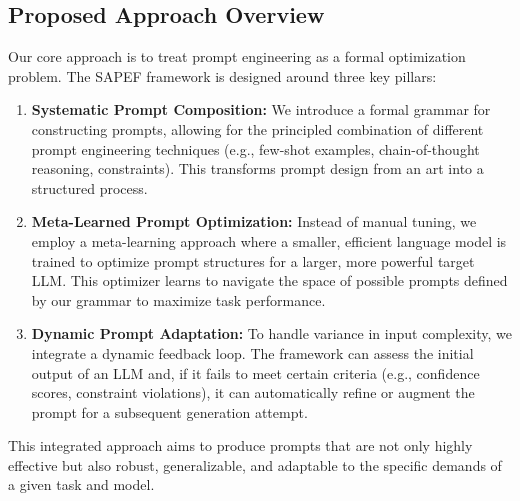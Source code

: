 \documentclass{article}
\begin{document}
\subsection{Proposed Approach Overview}
Our core approach is to treat prompt engineering as a formal optimization problem. The SAPEF framework is designed around three key pillars:
\begin{enumerate}
    \item \textbf{Systematic Prompt Composition:} We introduce a formal grammar for constructing prompts, allowing for the principled combination of different prompt engineering techniques (e.g., few-shot examples, chain-of-thought reasoning, constraints). This transforms prompt design from an art into a structured process.
    \item \textbf{Meta-Learned Prompt Optimization:} Instead of manual tuning, we employ a meta-learning approach where a smaller, efficient language model is trained to optimize prompt structures for a larger, more powerful target LLM. This optimizer learns to navigate the space of possible prompts defined by our grammar to maximize task performance.
    \item \textbf{Dynamic Prompt Adaptation:} To handle variance in input complexity, we integrate a dynamic feedback loop. The framework can assess the initial output of an LLM and, if it fails to meet certain criteria (e.g., confidence scores, constraint violations), it can automatically refine or augment the prompt for a subsequent generation attempt.
\end{enumerate}
This integrated approach aims to produce prompts that are not only highly effective but also robust, generalizable, and adaptable to the specific demands of a given task and model.
\end{document}
